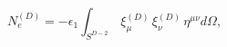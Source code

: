 \begin{equation}
N_{e}^{(D)}=-\epsilon_{1} \int_{S^{D-2}}\, \xi^{(D)}_{\mu}\, \xi^{(D)}_{\nu}\,
\eta^{\mu \nu} d\Omega,
\label{los1}
\end{equation}

